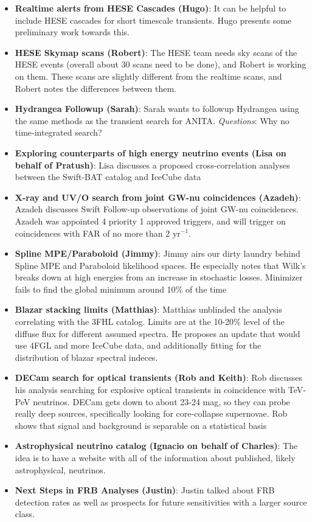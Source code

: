 \begin{itemize}
    \item \textbf{Realtime alerts from HESE Cascades (Hugo)}: It can be helpful to include HESE cascades for short timescale transients. Hugo presents some preliminary work towards this.
    \item \textbf{HESE Skymap scans (Robert)}: The HESE team needs sky scans of the HESE events (overall about 30 scans need to be done), and Robert is working on them. These scans are slightly different from the realtime scans, and Robert notes the differences between them.
    \item \textbf{Hydrangea Followup (Sarah)}: Sarah wants to followup Hydrangea using the same methods as the transient search for ANITA. \emph{Questions}: Why no time-integrated search?
    \item \textbf{Exploring counterparts of high energy neutrino events (Lisa on behalf of Pratush)}: Lisa discusses a proposed cross-correlation analyses between the Swift-BAT catalog and IceCube data 
    \item \textbf{X-ray and UV/O search from joint GW-nu coincidences (Azadeh)}: Azadeh discusses Swift Follow-up observations of joint GW-nu coincidences. Azadeh was appointed 4 priority 1 approved triggers, and will trigger on coincidences with FAR of no more than 2 yr$^{-1}$.
    \item \textbf{Spline MPE/Paraboloid (Jimmy)}: Jimmy airs our dirty laundry behind Spline MPE and Paraboloid likelihood spaces. He especially notes that Wilk's breaks down at high energies from an increase in stochastic losses. Minimizer fails to find the global minimum around 10$\%$ of the time
    \item \textbf{Blazar stacking limits (Matthias)}: Matthias unblinded the analysis correlating with the 3FHL catalog. Limits are at the 10-20$\%$ level of the diffuse flux for different assumed spectra. He proposes an update that would use 4FGL and more IceCube data, and additionally fitting for the distribution of blazar spectral indeces.
    \item \textbf{DECam search for optical transients (Rob and Keith)}: Rob discusses his analysis searching for explosive optical transients in coincidence with TeV-PeV neutrinos. DECam gets down to about 23-24 mag, so they can probe really deep sources, specifically looking for core-collapse supernovae. Rob shows that signal and background is separable on a statistical basis
    \item \textbf{Astrophysical neutrino catalog (Ignacio on behalf of Charles)}: The idea is to have a website with all of the information about published, likely astrophysical, neutrinos.
    \item{ \textbf{Next Steps in FRB Analyses (Justin)}}: Justin talked about FRB detection rates as well as prospects for future sensitivities with a larger source class.
\end{itemize}